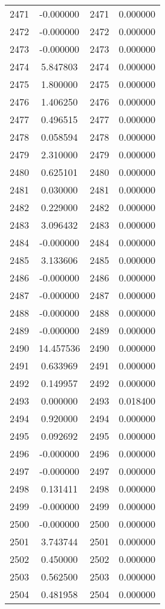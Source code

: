 \documentclass[12pt]{article}
\begin{document}
\begin{longtable}{@{}cccc@{}}
2471 & -0.000000 & 2471 & 0.000000 \\
2472 & -0.000000 & 2472 & 0.000000 \\
2473 & -0.000000 & 2473 & 0.000000 \\
2474 & 5.847803 & 2474 & 0.000000 \\
2475 & 1.800000 & 2475 & 0.000000 \\
2476 & 1.406250 & 2476 & 0.000000 \\
2477 & 0.496515 & 2477 & 0.000000 \\
2478 & 0.058594 & 2478 & 0.000000 \\
2479 & 2.310000 & 2479 & 0.000000 \\
2480 & 0.625101 & 2480 & 0.000000 \\
2481 & 0.030000 & 2481 & 0.000000 \\
2482 & 0.229000 & 2482 & 0.000000 \\
2483 & 3.096432 & 2483 & 0.000000 \\
2484 & -0.000000 & 2484 & 0.000000 \\
2485 & 3.133606 & 2485 & 0.000000 \\
2486 & -0.000000 & 2486 & 0.000000 \\
2487 & -0.000000 & 2487 & 0.000000 \\
2488 & -0.000000 & 2488 & 0.000000 \\
2489 & -0.000000 & 2489 & 0.000000 \\
2490 & 14.457536 & 2490 & 0.000000 \\
2491 & 0.633969 & 2491 & 0.000000 \\
2492 & 0.149957 & 2492 & 0.000000 \\
2493 & 0.000000 & 2493 & 0.018400 \\
2494 & 0.920000 & 2494 & 0.000000 \\
2495 & 0.092692 & 2495 & 0.000000 \\
2496 & -0.000000 & 2496 & 0.000000 \\
2497 & -0.000000 & 2497 & 0.000000 \\
2498 & 0.131411 & 2498 & 0.000000 \\
2499 & -0.000000 & 2499 & 0.000000 \\
2500 & -0.000000 & 2500 & 0.000000 \\
2501 & 3.743744 & 2501 & 0.000000 \\
2502 & 0.450000 & 2502 & 0.000000 \\
2503 & 0.562500 & 2503 & 0.000000 \\
2504 & 0.481958 & 2504 & 0.000000 \\

\end{longtable}
\end{document}
